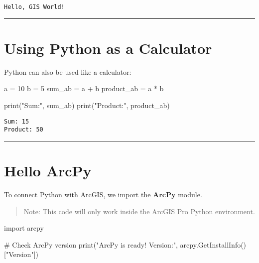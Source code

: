 \documentclass[
  11pt,
  letterpaper,
]{book}
\newenvironment{Shaded}{\begin{snugshade}}{\end{snugshade}}
\newcommand{\BuiltInTok}[1]{\textcolor[rgb]{0.00,0.23,0.31}{#1}}
\newcommand{\CommentTok}[1]{\textcolor[rgb]{0.37,0.37,0.37}{#1}}
\newcommand{\DecValTok}[1]{\textcolor[rgb]{0.68,0.00,0.00}{#1}}
\newcommand{\ImportTok}[1]{\textcolor[rgb]{0.00,0.46,0.62}{#1}}
\newcommand{\NormalTok}[1]{\textcolor[rgb]{0.00,0.23,0.31}{#1}}
\newcommand{\OperatorTok}[1]{\textcolor[rgb]{0.37,0.37,0.37}{#1}}
\newcommand{\StringTok}[1]{\textcolor[rgb]{0.13,0.47,0.30}{#1}}
\begin{document}
\begin{verbatim}
Hello, GIS World!
\end{verbatim}

\begin{center}\rule{0.5\linewidth}{0.5pt}\end{center}

\section{Using Python as a
Calculator}\label{using-python-as-a-calculator}

Python can also be used like a calculator:

\begin{Shaded}
\begin{Highlighting}[]
\NormalTok{a }\OperatorTok{=} \DecValTok{10}
\NormalTok{b }\OperatorTok{=} \DecValTok{5}
\NormalTok{sum\_ab }\OperatorTok{=}\NormalTok{ a }\OperatorTok{+}\NormalTok{ b}
\NormalTok{product\_ab }\OperatorTok{=}\NormalTok{ a }\OperatorTok{*}\NormalTok{ b}

\BuiltInTok{print}\NormalTok{(}\StringTok{"Sum:"}\NormalTok{, sum\_ab)}
\BuiltInTok{print}\NormalTok{(}\StringTok{"Product:"}\NormalTok{, product\_ab)}
\end{Highlighting}
\end{Shaded}

\begin{verbatim}
Sum: 15
Product: 50
\end{verbatim}

\begin{center}\rule{0.5\linewidth}{0.5pt}\end{center}

\section{Hello ArcPy}\label{hello-arcpy}

To connect Python with ArcGIS, we import the \textbf{ArcPy} module.

\begin{quote}
Note: This code will only work inside the ArcGIS Pro Python environment.
\end{quote}

\begin{Shaded}
\begin{Highlighting}[]
\ImportTok{import}\NormalTok{ arcpy}

\CommentTok{\# Check ArcPy version}
\BuiltInTok{print}\NormalTok{(}\StringTok{"ArcPy is ready! Version:"}\NormalTok{, arcpy.GetInstallInfo()[}\StringTok{"Version"}\NormalTok{])}
\end{Highlighting}
\end{Shaded}
\end{document}
